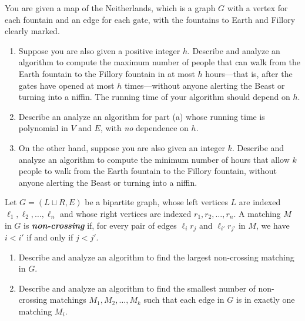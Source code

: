 \begin{exercises}
You are given a map of the Neitherlands, which is a graph $G$ with a vertex for each fountain and an edge for each gate, with the fountains to Earth and Fillory clearly marked.
\begin{enumerate}
\item Suppose you are also given a positive integer $h$.
Describe and analyze an algorithm to compute the maximum number of people that can walk from the Earth fountain to the Fillory fountain in at most $h$ hours—that is, after the gates have opened at most $h$ times—without anyone alerting the Beast or turning into a niffin.
The running time of your algorithm should depend on $h$.
\item {} Describe an analyze an algorithm for part (a) whose running time is polynomial in $V$ and $E$, with \textit{no} dependence on $h$.
\item On the other hand, suppose you are also given an integer $k$.
Describe and analyze an algorithm to compute the minimum number of hours that allow $k$ people to walk from the Earth fountain to the Fillory fountain, without anyone alerting the Beast or turning into a niffin.
\end{enumerate}

\item {}
\label{ex:11.20}
Let $G = (L \sqcup R, E)$ be a bipartite graph, whose left vertices $L$ are indexed $\ell_1, \ell_2, \dots, \ell_n$ and whose right vertices are indexed $r_1, r_2, \dots, r_n$.
A matching $M$ in $G$ is \textbf{\textit{non-crossing}} if, for every pair of edges $\ell_i r_j$ and $\ell_{i'} r_{j'}$ in $M$, we have $i < i'$ if and only if $j < j'$.
\begin{enumerate}
\item Describe and analyze an algorithm to find the largest non-crossing matching in $G$.
\item Describe and analyze an algorithm to find the smallest number of non-crossing matchings $M_1, M_2, \dots, M_k$ such that each edge in $G$ is in exactly one matching $M_i$.
\end{enumerate}


\end{exercises}
